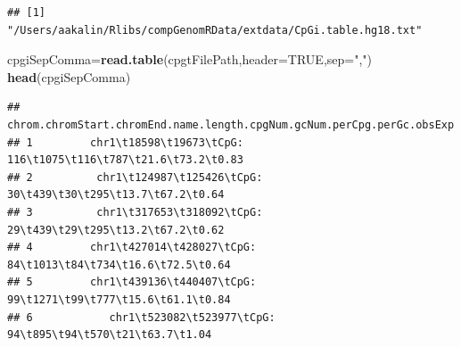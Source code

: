 \documentclass[12pt,]{krantz}
\newenvironment{Shaded}{\begin{snugshade}}{\end{snugshade}}
\newcommand{\DataTypeTok}[1]{\textcolor[rgb]{0.13,0.29,0.53}{#1}}
\newcommand{\KeywordTok}[1]{\textcolor[rgb]{0.13,0.29,0.53}{\textbf{#1}}}
\newcommand{\NormalTok}[1]{#1}
\newcommand{\OtherTok}[1]{\textcolor[rgb]{0.56,0.35,0.01}{#1}}
\newcommand{\StringTok}[1]{\textcolor[rgb]{0.31,0.60,0.02}{#1}}
\begin{document}
\begin{verbatim}
## [1] "/Users/aakalin/Rlibs/compGenomRData/extdata/CpGi.table.hg18.txt"
\end{verbatim}

\begin{Shaded}
\begin{Highlighting}[]
\NormalTok{cpgiSepComma=}\KeywordTok{read.table}\NormalTok{(cpgtFilePath,}\DataTypeTok{header=}\OtherTok{TRUE}\NormalTok{,}\DataTypeTok{sep=}\StringTok{","}\NormalTok{)}
\KeywordTok{head}\NormalTok{(cpgiSepComma)}
\end{Highlighting}
\end{Shaded}

\begin{verbatim}
##   chrom.chromStart.chromEnd.name.length.cpgNum.gcNum.perCpg.perGc.obsExp
## 1         chr1\t18598\t19673\tCpG: 116\t1075\t116\t787\t21.6\t73.2\t0.83
## 2          chr1\t124987\t125426\tCpG: 30\t439\t30\t295\t13.7\t67.2\t0.64
## 3          chr1\t317653\t318092\tCpG: 29\t439\t29\t295\t13.2\t67.2\t0.62
## 4         chr1\t427014\t428027\tCpG: 84\t1013\t84\t734\t16.6\t72.5\t0.64
## 5         chr1\t439136\t440407\tCpG: 99\t1271\t99\t777\t15.6\t61.1\t0.84
## 6            chr1\t523082\t523977\tCpG: 94\t895\t94\t570\t21\t63.7\t1.04
\end{verbatim}
\end{document}
